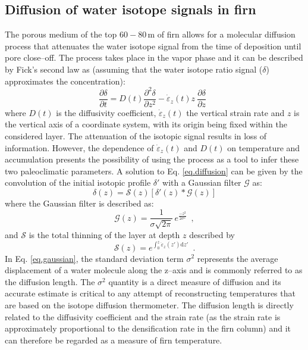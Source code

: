 \documentclass[11pt, draftcls, onecolumn]{IEEEtran} %
\numberwithin{equation}{section}
\numberwithin{table}{section}
\numberwithin{figure}{section}
\begin{document}
\subsection{Diffusion of water isotope signals in firn}
The porous medium of the top $60-80\, \mathrm{m}$ of firn allows for a molecular diffusion process that attenuates
the water isotope signal from the time of deposition until  pore close--off. 
The process takes place in the vapor phase and it can be described by Fick's second law as
(assuming that the water isotope ratio signal ($\delta$) approximates the concentration):
\begin{equation}
\frac{\partial \delta}{\partial t} = D \left( t \right) \frac{\partial^2 \delta}{\partial z^2} - 
\dot{\varepsilon}_z \left( t \right) z ~\frac{\partial \delta}{\partial z} \enspace 
\label{eq.diffusion}
\end{equation}
where $D \left( t \right)$ is the diffusivity coefficient, $\dot{\varepsilon}_z\left(t\right)$
the vertical strain rate and  $z$ is the vertical axis of a coordinate system, 
with its origin being fixed within the considered layer.
The attenuation of the isotopic signal results in loss of information.
However, the dependence of $\dot{\varepsilon}_z\left(t\right)$  and $D \left( t \right)$ 
on temperature and accumulation presents the possibility of using the process as a tool
to infer these two paleoclimatic parameters. A solution to Eq. \ref{eq.diffusion} can be given by
the convolution of the initial isotopic profile $\delta'$ with a Gaussian filter $\mathcal{G}$ as:
\begin{equation}
\delta \left( z\right) = \mathcal{S} \left( z \right) \left[ \delta ' \left( z \right) 
\ast \mathcal{G} \left( z \right) \right]
\label{eq.convolution}
\end{equation}
where the Gaussian filter is described as:
\begin{equation}
\mathcal{G}\left(z \right) = \frac{1}{\sigma \sqrt{2\pi}} \, e^{\frac{-z^2}{2 \sigma^2}} \enspace ,
\label{eq.gaussian}
\end{equation}
and $\mathcal{S}$ is the total thinning of the layer at depth $z$ described by
\begin{equation}
\mathcal{S} \left( z \right) = e^{\int_0^{z} \dot{\varepsilon}_z \left( z' \right) \mathrm{d}z'} \enspace .
\label{eq.thinning}
\end{equation}
In Eq. \ref{eq.gaussian}, the standard deviation term $\sigma^2$ represents the average 
displacement of a water molecule along the z--axis and is commonly referred to as the diffusion length.
The $\sigma^2$ quantity is a direct measure of diffusion and its accurate estimate is critical
to any attempt of reconstructing temperatures that are based on the isotope diffusion thermometer.  
The diffusion length is directly related to the diffusivity coefficient and the strain rate 
(as the strain rate is approximately proportional to the densification rate in the firn column)
and it can therefore be regarded as a measure of firn temperature.
\end{document}
